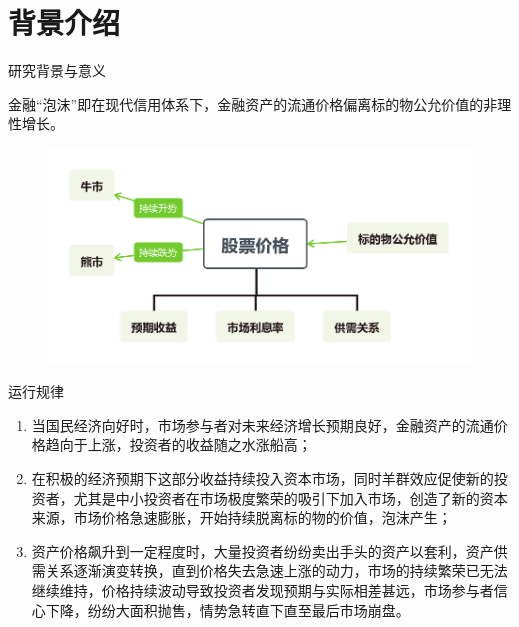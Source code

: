 \section{背景介绍}
\begin{frame}[t]{研究背景与意义}
    \begin{definition}[金融泡沫]
        金融“泡沫”即在现代信用体系下，金融资产的流通价格偏离标的物公允价值的非理性增长。
    \end{definition}
    \begin{figure}
        \centering
        \includegraphics[width=.8\textwidth]{figures/stock}
    \end{figure}
\end{frame}

\begin{frame}[t]{运行规律}
    \begin{enumerate}
        \item 当国民经济向好时，市场参与者对未来经济增长预期良好，金融资产的流通价格趋向于上涨，投资者的收益随之水涨船高；\\[0.5cm]
        \item 在积极的经济预期下这部分收益持续投入资本市场，同时羊群效应促使新的投资者，尤其是中小投资者在市场极度繁荣的吸引下加入市场，创造了新的资本来源，市场价格急速膨胀，开始持续脱离标的物的价值，泡沫产生；\\[0.5cm]
        \item 资产价格飙升到一定程度时，大量投资者纷纷卖出手头的资产以套利，资产供需关系逐渐演变转换，直到价格失去急速上涨的动力，市场的持续繁荣已无法继续维持，价格持续波动导致投资者发现预期与实际相差甚远，市场参与者信心下降，纷纷大面积抛售，情势急转直下直至最后市场崩盘。
    \end{enumerate}
\end{frame}

